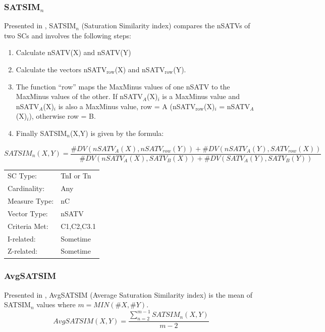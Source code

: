 \documentclass{article}
\begin{document}
\subsubsection{SATSIM$_{n}$}
\label{sec-11-10-2}

Presented in \citet[chap. 2.4]{Buchler1997}, SATSIM$_{n}$ (Saturation
Similarity index) compares the nSATVs of two SCs and involves the
following steps:
\begin{enumerate}
\item Calculate nSATV(X) and nSATV(Y)
\item Calculate the vectors nSATV$_{\mathrm{row}}$(X) and nSATV$_{\mathrm{row}}$(Y).
\item The function ``row'' maps the MaxMinus values of one nSATV to the
   MaxMinus values of the other. If nSATV$_{A}$(X)$_{i}$ is a MaxMinus
   value and nSATV$_{A}$(X)$_{i}$ is also a MaxMinus value, row = A
   (nSATV$_{\mathrm{row}}$(X)$_{i}$ = nSATV$_{A}$(X)$_{i}$), otherwise row = B.
\item Finally SATSIM$_{n}$(X,Y) is given by the formula:
\end{enumerate}

$$SATSIM_{n}(X,Y)=\frac{\#DV(nSATV_{A}(X),nSATV_{row}(Y))+\#DV(nSATV_{A}(Y),SATV_{row}(X))}{\#DV(nSATV_{A}(X),SATV_{B}(X))+\#DV(SATV_{A}(Y),SATV_{B}(Y))}$$

\begin{center}
\begin{tabular}{ll}
 SC Type:       &  TnI or Tn   \\
 Cardinality:   &  Any         \\
 Measure Type:  &  nC          \\
 Vector Type:   &  nSATV       \\
 Criteria Met:  &  C1,C2,C3.1  \\
 I-related:     &  Sometime    \\
 Z-related:     &  Sometime    \\
\end{tabular}
\end{center}
\subsubsection{AvgSATSIM}
\label{sec-11-10-3}

Presented in \citet[chap. 2.10]{Buchler1997}, AvgSATSIM (Average
Saturation Similarity index) is the mean of SATSIM$_{n}$ values where
$m=MIN(\#X,\#Y)$. $$AvgSATSIM(X,Y)=\frac{\sum_{n=2}^{m-1}{SATSIM_{n}(X,Y)}}{m-2}$$
\end{document}
